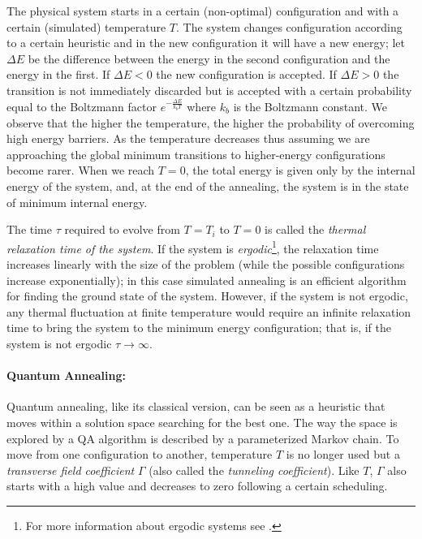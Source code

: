 The physical system starts in a certain (non-optimal) configuration and with a certain (simulated) temperature $T$. The system changes configuration according to a certain heuristic and in the new configuration it will have a new energy; let $\Delta E$ be the difference between the energy in the second configuration and the energy in the first. If $\Delta E < 0$ the new configuration is accepted. If $\Delta E > 0$ the transition is not immediately discarded but is accepted with a certain probability equal to the Boltzmann factor $e^{-\frac{\Delta E}{k_b T}}$ where $k_b$ is the Boltzmann constant. We observe that the higher the temperature, the higher the probability of overcoming high energy barriers. As the temperature decreases \textemdash{}thus assuming we are approaching the global minimum\textemdash{} transitions to higher-energy configurations become rarer. When we reach $T = 0$, the total energy is given only by the internal energy of the system, and, at the end of the annealing, the system is in the state of minimum internal energy.

The time $\tau$ required to evolve from $T = T_i$ to $T = 0$ is called the \emph{thermal relaxation time of the system}. If the system is \emph{ergodic}\footnote{For more information about ergodic systems see \cite{kim2005ergodicity}.}, the relaxation time increases linearly with the size of the problem (while the possible configurations increase exponentially); in this case simulated annealing is an efficient algorithm for finding the ground state of the system. However, if the system is not ergodic, any thermal fluctuation at finite temperature would require an infinite relaxation time to bring the system to the minimum energy configuration; that is, if the system is not ergodic $\tau \rightarrow \infty$.

\paragraph{Quantum Annealing:} Quantum annealing, like its classical version, can be seen as a heuristic that moves within a solution space searching for the best one. The way the space is explored by a QA algorithm is described by a parameterized Markov chain. To move from one configuration to another, temperature $T$ is no longer used but a \emph{transverse field coefficient} $\Gamma$ (also called the \emph{tunneling coefficient}). Like $T$, $\Gamma$ also starts with a high value and decreases to zero following a certain scheduling.


